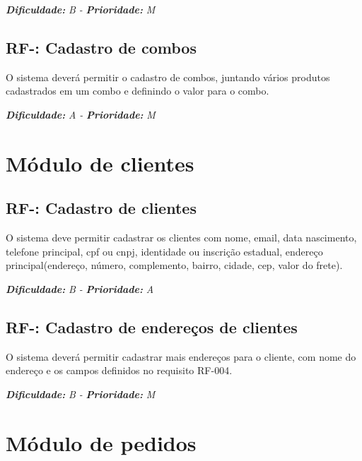 \vspace{0.5cm}
\noindent\textbf{\textit{Dificuldade:}} \textit{B -} \textbf{\textit{Prioridade:}} \textit{M}
\vspace{0.5cm}
\pgfmathtruncatemacro{}
\subsection{RF-\nreq: Cadastro de combos}
O sistema deverá permitir o cadastro de combos, juntando vários produtos cadastrados em um combo e definindo o valor
para o combo.

\vspace{0.5cm}
\noindent\textbf{\textit{Dificuldade:}} \textit{A -} \textbf{\textit{Prioridade:}} \textit{M}
\vspace{0.5cm}

\section{Módulo de clientes}
\vspace{0.5cm}
\pgfmathtruncatemacro{}
\subsection{RF-\nreq: Cadastro de clientes}
O sistema deve permitir cadastrar os clientes com nome, email, data nascimento, telefone principal, cpf ou cnpj, identidade ou 
inscrição estadual, endereço principal(endereço, número, complemento, bairro, cidade, cep, valor do frete).

\vspace{0.5cm}
\noindent\textbf{\textit{Dificuldade:}} \textit{B -} \textbf{\textit{Prioridade:}} \textit{A}
\vspace{0.5cm}

\pgfmathtruncatemacro{}
\subsection{RF-\nreq: Cadastro de endereços de clientes}
O sistema deverá permitir cadastrar mais endereços para o cliente, com nome do endereço e os campos definidos no requisito RF-004.

\vspace{0.5cm}
\noindent\textbf{\textit{Dificuldade:}} \textit{B -} \textbf{\textit{Prioridade:}} \textit{M}
\vspace{0.5cm}

\section{Módulo de pedidos}
\vspace{0.5cm}
\pgfmathtruncatemacro{}
